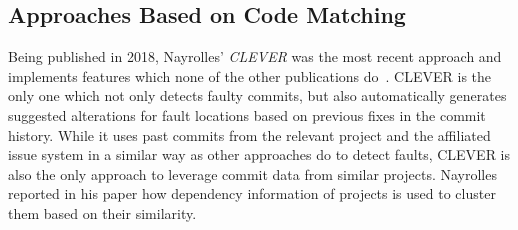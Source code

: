 




\subsection{Approaches Based on Code Matching}%
\label{sec:codematching}
\label{sec:comparison-codematching}

Being published in 2018, Nayrolles' \textit{CLEVER} was the most recent approach and implements features which none of the other publications do~\cite{Nayrolles2018}. CLEVER is the only one which not only detects faulty commits, but also automatically generates suggested alterations for fault locations based on previous fixes in the commit history. While it uses past commits from the relevant project and the affiliated issue system in a similar way as other approaches do to detect faults, CLEVER is also the only approach to leverage commit data from similar projects. Nayrolles reported in his paper how dependency information of projects is used to cluster them based on their similarity.

